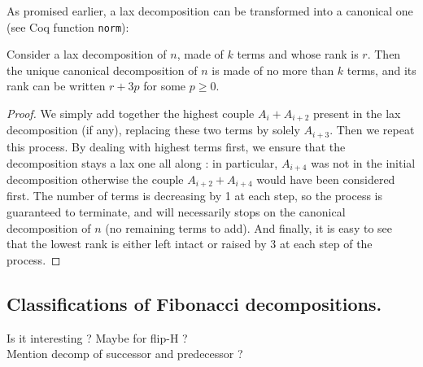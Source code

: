 \documentclass[a4paper,11pt]{article}
\begin{document}
As promised earlier, a lax decomposition can be transformed into
a canonical one (see Coq function {\tt norm}):

\begin{theorem}[normalization]\label{norm}
Consider a lax decomposition of $n$, made of $k$ terms and
whose rank is $r$. Then the unique canonical decomposition
of $n$ is made of no more than $k$ terms, and its rank can
be written $r+3p$ for some $p\ge 0$.
\end{theorem}
\begin{proof}
We simply add together the highest couple $A_i + A_{i+2}$ present in
the lax decomposition (if any), replacing these two terms by
solely $A_{i+3}$. Then we repeat this process.
By dealing with highest terms first, we ensure that the decomposition
stays a lax one all along : in particular, $A_{i+4}$ was not in
the initial decomposition otherwise the couple $A_{i+2} + A_{i+4}$ would have
been considered first. The number of
terms is decreasing by 1 at each step, so the process is guaranteed to
terminate, and will necessarily stops on the canonical decomposition
of $n$ (no remaining terms to add).
And finally, it is easy to see that the
lowest rank is either left intact or raised by 3 at each step of the process.
\end{proof}

\subsection{Classifications of Fibonacci decompositions.}

\TODO Is it interesting ? Maybe for flip-H ? \\
\TODO Mention decomp of successor and predecessor ?
\end{document}
